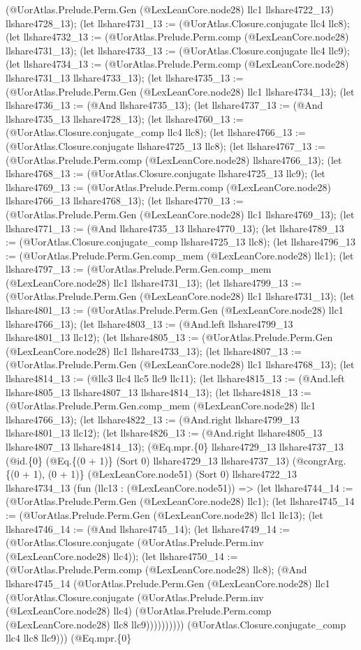 \documentclass[11pt]{article}
\begin{document}
(@UorAtlas.Prelude.Perm.Gen (@LexLeanCore.node28) llc1 llshare4722\_13) llshare4728\_13); (let llshare4731\_13 := (@UorAtlas.Closure.conjugate llc4 llc8); (let llshare4732\_13 := (@UorAtlas.Prelude.Perm.comp (@LexLeanCore.node28) llshare4731\_13); (let llshare4733\_13 := (@UorAtlas.Closure.conjugate llc4 llc9); (let llshare4734\_13 := (@UorAtlas.Prelude.Perm.comp (@LexLeanCore.node28) llshare4731\_13 llshare4733\_13); (let llshare4735\_13 := (@UorAtlas.Prelude.Perm.Gen (@LexLeanCore.node28) llc1 llshare4734\_13); (let llshare4736\_13 := (@And llshare4735\_13); (let llshare4737\_13 := (@And llshare4735\_13 llshare4728\_13); (let llshare4760\_13 := (@UorAtlas.Closure.conjugate\_comp llc4 llc8); (let llshare4766\_13 := (@UorAtlas.Closure.conjugate llshare4725\_13 llc8); (let llshare4767\_13 := (@UorAtlas.Prelude.Perm.comp (@LexLeanCore.node28) llshare4766\_13); (let llshare4768\_13 := (@UorAtlas.Closure.conjugate llshare4725\_13 llc9); (let llshare4769\_13 := (@UorAtlas.Prelude.Perm.comp (@LexLeanCore.node28) llshare4766\_13 llshare4768\_13); (let llshare4770\_13 := (@UorAtlas.Prelude.Perm.Gen (@LexLeanCore.node28) llc1 llshare4769\_13); (let llshare4771\_13 := (@And llshare4735\_13 llshare4770\_13); (let llshare4789\_13 := (@UorAtlas.Closure.conjugate\_comp llshare4725\_13 llc8); (let llshare4796\_13 := (@UorAtlas.Prelude.Perm.Gen.comp\_mem (@LexLeanCore.node28) llc1); (let llshare4797\_13 := (@UorAtlas.Prelude.Perm.Gen.comp\_mem (@LexLeanCore.node28) llc1 llshare4731\_13); (let llshare4799\_13 := (@UorAtlas.Prelude.Perm.Gen (@LexLeanCore.node28) llc1 llshare4731\_13); (let llshare4801\_13 := (@UorAtlas.Prelude.Perm.Gen (@LexLeanCore.node28) llc1 llshare4766\_13); (let llshare4803\_13 := (@And.left llshare4799\_13 llshare4801\_13 llc12); (let llshare4805\_13 := (@UorAtlas.Prelude.Perm.Gen (@LexLeanCore.node28) llc1 llshare4733\_13); (let llshare4807\_13 := (@UorAtlas.Prelude.Perm.Gen (@LexLeanCore.node28) llc1 llshare4768\_13); (let llshare4814\_13 := (@llc3 llc4 llc5 llc9 llc11); (let llshare4815\_13 := (@And.left llshare4805\_13 llshare4807\_13 llshare4814\_13); (let llshare4818\_13 := (@UorAtlas.Prelude.Perm.Gen.comp\_mem (@LexLeanCore.node28) llc1 llshare4766\_13); (let llshare4822\_13 := (@And.right llshare4799\_13 llshare4801\_13 llc12); (let llshare4826\_13 := (@And.right llshare4805\_13 llshare4807\_13 llshare4814\_13); (@Eq.mpr.\{0\} llshare4729\_13 llshare4737\_13 (@id.\{0\} (@Eq.\{(0 + 1)\} (Sort 0) llshare4729\_13 llshare4737\_13) (@congrArg.\{(0 + 1), (0 + 1)\} (@LexLeanCore.node51) (Sort 0) llshare4722\_13 llshare4734\_13 (fun (llc13 : (@LexLeanCore.node51)) => (let llshare4744\_14 := (@UorAtlas.Prelude.Perm.Gen (@LexLeanCore.node28) llc1); (let llshare4745\_14 := (@UorAtlas.Prelude.Perm.Gen (@LexLeanCore.node28) llc1 llc13); (let llshare4746\_14 := (@And llshare4745\_14); (let llshare4749\_14 := (@UorAtlas.Closure.conjugate (@UorAtlas.Prelude.Perm.inv (@LexLeanCore.node28) llc4)); (let llshare4750\_14 := (@UorAtlas.Prelude.Perm.comp (@LexLeanCore.node28) llc8); (@And llshare4745\_14 (@UorAtlas.Prelude.Perm.Gen (@LexLeanCore.node28) llc1 (@UorAtlas.Closure.conjugate (@UorAtlas.Prelude.Perm.inv (@LexLeanCore.node28) llc4) (@UorAtlas.Prelude.Perm.comp (@LexLeanCore.node28) llc8 llc9)))))))))) (@UorAtlas.Closure.conjugate\_comp llc4 llc8 llc9))) (@Eq.mpr.\{0\} 
\end{document}
